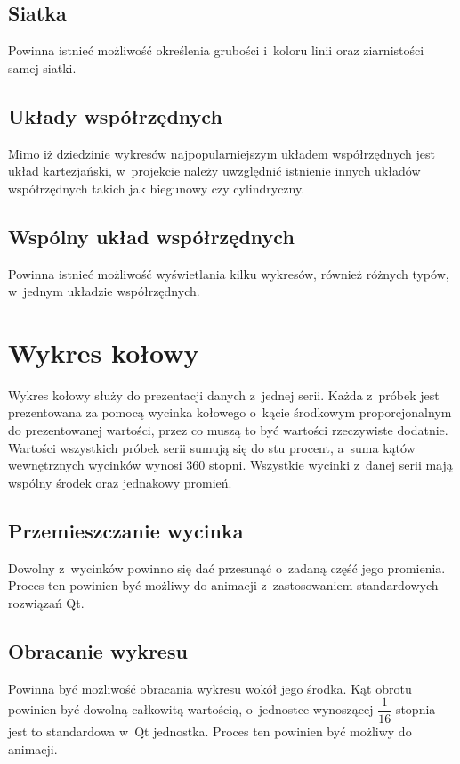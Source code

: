\subsection{Siatka}
Powinna istnieć możliwość określenia grubości i~koloru linii oraz ziarnistości samej siatki.

\subsection{Układy współrzędnych}
Mimo iż dziedzinie wykresów najpopularniejszym układem współrzędnych jest układ kartezjański, w~projekcie należy uwzględnić istnienie innych układów współrzędnych takich jak biegunowy czy cylindryczny.

\subsection{Wspólny układ współrzędnych}
Powinna istnieć możliwość wyświetlania kilku wykresów, również różnych typów, w~jednym układzie współrzędnych.





\section{Wykres kołowy}
Wykres kołowy służy do prezentacji danych z~jednej serii. Każda z~próbek jest prezentowana za pomocą wycinka kołowego o~kącie środkowym proporcjonalnym do prezentowanej wartości, przez co muszą to być wartości rzeczywiste dodatnie. Wartości wszystkich próbek serii sumują się do stu procent, a~suma kątów wewnętrznych wycinków wynosi 360 stopni. Wszystkie wycinki z~danej serii mają wspólny środek oraz jednakowy promień.

\subsection{Przemieszczanie wycinka}
Dowolny z~wycinków powinno się dać przesunąć o~zadaną część jego promienia. Proces ten powinien być możliwy do animacji z~zastosowaniem standardowych rozwiązań Qt.

\subsection{Obracanie wykresu}
Powinna być możliwość obracania wykresu wokół jego środka. Kąt obrotu powinien być dowolną całkowitą wartością, o~jednostce wynoszącej $\dfrac{1}{16}$ stopnia -- jest to standardowa w~Qt jednostka. Proces ten powinien być możliwy do animacji.
 

